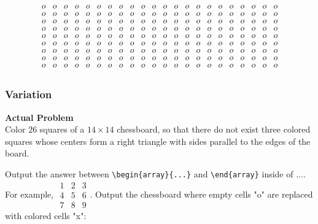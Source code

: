$$\begin{array}{cccccccccccccccccccccc}
o & o & o & o & o & o & o & o & o & o & o & o & o & o & o & o & o & o & o & o & o & o \\
o & o & o & o & o & o & o & o & o & o & o & o & o & o & o & o & o & o & o & o & o & o \\
o & o & o & o & o & o & o & o & o & o & o & o & o & o & o & o & o & o & o & o & o & o \\
o & o & o & o & o & o & o & o & o & o & o & o & o & o & o & o & o & o & o & o & o & o \\
o & o & o & o & o & o & o & o & o & o & o & o & o & o & o & o & o & o & o & o & o & o \\
o & o & o & o & o & o & o & o & o & o & o & o & o & o & o & o & o & o & o & o & o & o \\
o & o & o & o & o & o & o & o & o & o & o & o & o & o & o & o & o & o & o & o & o & o \\
o & o & o & o & o & o & o & o & o & o & o & o & o & o & o & o & o & o & o & o & o & o \\
o & o & o & o & o & o & o & o & o & o & o & o & o & o & o & o & o & o & o & o & o & o \\
\end{array}$$

\subsubsection{Variation}
\textbf{Actual Problem}\\
Color $26$ squares of a $14 \times 14$ chessboard, so that there do not exist three colored squares whose centers form a right triangle with sides parallel to the edges of the board.

Output the answer between \verb|\begin{array}{...}| and \verb|\end{array}| inside of $\boxed{...}$. For example, $\boxed{\begin{array}{ccc}1 & 2 & 3 \\ 4 & 5 & 6 \\ 7 & 8 & 9\end{array}}$.
Output the chessboard where empty cells "o" are replaced with colored cells "x":

